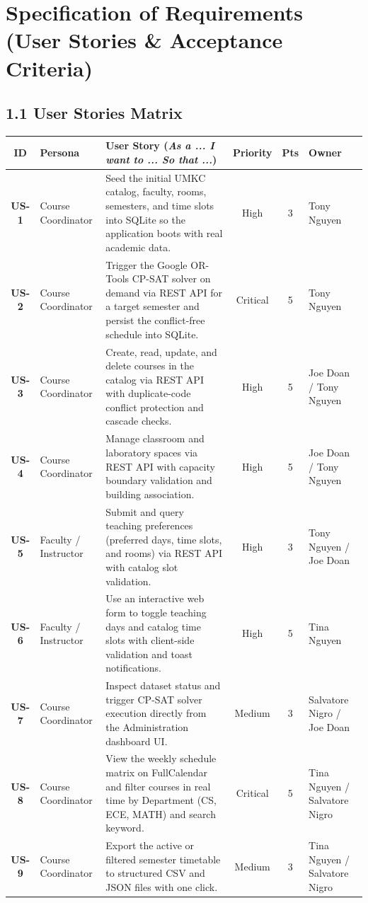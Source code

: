 \documentclass[10pt,letterpaper]{article}
\begin{document}
\section{Specification of Requirements (User Stories \& Acceptance Criteria)}

\subsection*{1.1 User Stories Matrix}
\renewcommand{\arraystretch}{1.2}
\noindent
\begin{tabularx}{\textwidth}{|c|p{2.6cm}|X|c|c|p{2.3cm}|}
\hline
\rowcolor{tableheader}
\textbf{\sffamily ID} & \textbf{\sffamily Persona} & \textbf{\sffamily User Story (\textit{As a ... I want to ... So that ...})} & \textbf{\sffamily Priority} & \textbf{\sffamily Pts} & \textbf{\sffamily Owner} \\ \hline
\textbf{US-1} & Course Coordinator & Seed the initial UMKC catalog, faculty, rooms, semesters, and time slots into SQLite so the application boots with real academic data. & High & 3 & Tony Nguyen \\ \hline
\textbf{US-2} & Course Coordinator & Trigger the Google OR-Tools CP-SAT solver on demand via REST API for a target semester and persist the conflict-free schedule into SQLite. & Critical & 5 & Tony Nguyen \\ \hline
\textbf{US-3} & Course Coordinator & Create, read, update, and delete courses in the catalog via REST API with duplicate-code conflict protection and cascade checks. & High & 5 & Joe Doan / Tony Nguyen \\ \hline
\textbf{US-4} & Course Coordinator & Manage classroom and laboratory spaces via REST API with capacity boundary validation and building association. & High & 5 & Joe Doan / Tony Nguyen \\ \hline
\textbf{US-5} & Faculty / Instructor & Submit and query teaching preferences (preferred days, time slots, and rooms) via REST API with catalog slot validation. & High & 3 & Tony Nguyen / Joe Doan \\ \hline
\textbf{US-6} & Faculty / Instructor & Use an interactive web form to toggle teaching days and catalog time slots with client-side validation and toast notifications. & High & 5 & Tina Nguyen \\ \hline
\textbf{US-7} & Course Coordinator & Inspect dataset status and trigger CP-SAT solver execution directly from the Administration dashboard UI. & Medium & 3 & Salvatore Nigro / Joe Doan \\ \hline
\textbf{US-8} & Course Coordinator & View the weekly schedule matrix on FullCalendar and filter courses in real time by Department (CS, ECE, MATH) and search keyword. & Critical & 5 & Tina Nguyen / Salvatore Nigro \\ \hline
\textbf{US-9} & Course Coordinator & Export the active or filtered semester timetable to structured CSV and JSON files with one click. & Medium & 3 & Tina Nguyen / Salvatore Nigro \\ \hline
\end{tabularx}
\end{document}

